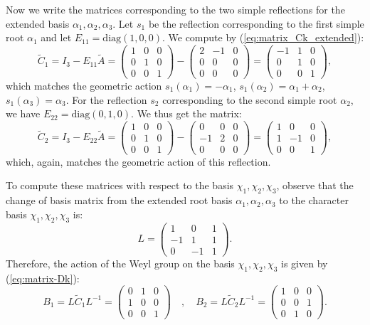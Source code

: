 \documentclass[11pt,english]{amsart}
\numberwithin{equation}{section}
\numberwithin{figure}{section}
\theoremstyle{plain}
\theoremstyle{plain}
\theoremstyle{definition}
\theoremstyle{remark}
\begin{document}
Now we write the matrices corresponding to the two simple reflections for the 
extended basis $\alpha_1, \alpha_2, \alpha_3$. Let $s_1$ be the reflection 
corresponding to the first simple root $\alpha_1$ and let $E_{11}=\text{diag}(1,0,0)$. 
We compute by (\ref{eq:matrix_Ck_extended}):
\[
\widetilde{C}_{1} = I_3 - E_{11}\widetilde{A} = \begin{pmatrix} 1 & 0 & 0 \\ 0 & 1 & 0 \\ 0 & 0 & 1 \end{pmatrix} - \begin{pmatrix} 2 & -1 & 0 \\ 0 & 0 & 0 \\ 0 & 0 & 0 \end{pmatrix} = \begin{pmatrix} -1 & 1 & 0 \\ 0 & 1 & 0 \\ 0 & 0 & 1 \end{pmatrix},
\]
which matches the geometric action
$ s_1(\alpha_1)=-\alpha_1$, $s_1(\alpha_2)=\alpha_1+\alpha_2$, $s_1(\alpha_3)=\alpha_3$. 
For the reflection $s_2$ corresponding to the second simple root $\alpha_2$, we have $E_{22} = \text{diag}(0,1,0)$. We thus get the matrix:
\[
    \widetilde{C}_{2} = I_3 - E_{22}\widetilde{A} = \begin{pmatrix} 1 & 0 & 0 \\ 0 & 1 & 0 \\ 0 & 0 & 1 \end{pmatrix} - \begin{pmatrix} 0 & 0 & 0 \\ -1 & 2 & 0 \\ 0 & 0 & 0 \end{pmatrix} = \begin{pmatrix} 1 & 0 & 0 \\ 1 & -1 & 0 \\ 0 & 0 & 1 \end{pmatrix},
\]
which, again, matches the geometric action of this reflection.

To compute these matrices with respect to the basis $\chi_1, \chi_2, \chi_3$, observe 
that the change of basis matrix from the extended root basis $\alpha_1, \alpha_2, \alpha_3$ 
to the character basis $\chi_1, \chi_2, \chi_3$ is:
\[
L = \begin{pmatrix}
    1 & 0 & 1 \\
    -1 & 1 & 1 \\
    0 & -1 & 1
\end{pmatrix}.
\]
Therefore, the action of the Weyl group on the basis $\chi_1, \chi_2, \chi_3$ is given by (\ref{eq:matrix-Dk}):
\[
B_{1} = L\widetilde{C}_{1}L^{-1} = \begin{pmatrix} 0 & 1 & 0 \\ 1 & 0 & 0 \\ 0 & 0 & 1 \end{pmatrix}\quad , \quad B_{2} = L\widetilde{C}_{2}L^{-1} = \begin{pmatrix} 1 & 0 & 0 \\ 0 & 0 & 1 \\ 0 & 1 & 0 \end{pmatrix}.
\]
\end{document}
